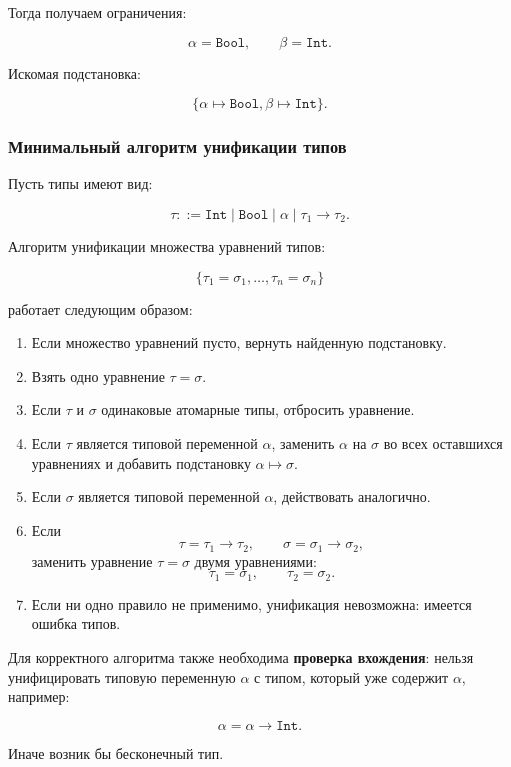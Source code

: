\documentclass[12pt,a4paper]{article}
\begin{document}
Тогда получаем ограничения:

\[
\alpha = \texttt{Bool},
\qquad
\beta = \texttt{Int}.
\]

Искомая подстановка:

\[
\{\alpha \mapsto \texttt{Bool}, \beta \mapsto \texttt{Int}\}.
\]

\subsubsection{Минимальный алгоритм унификации типов}

Пусть типы имеют вид:

\[
\tau ::= \texttt{Int}
\mid \texttt{Bool}
\mid \alpha
\mid \tau_1 \to \tau_2.
\]

Алгоритм унификации множества уравнений типов:

\[
\{\tau_1 = \sigma_1, \ldots, \tau_n = \sigma_n\}
\]

работает следующим образом:

\begin{enumerate}
    \item Если множество уравнений пусто, вернуть найденную подстановку.
    \item Взять одно уравнение \(\tau = \sigma\).
    \item Если \(\tau\) и \(\sigma\) одинаковые атомарные типы, отбросить уравнение.
    \item Если \(\tau\) является типовой переменной \(\alpha\), заменить \(\alpha\)
    на \(\sigma\) во всех оставшихся уравнениях и добавить подстановку
    \(\alpha \mapsto \sigma\).
    \item Если \(\sigma\) является типовой переменной \(\alpha\), действовать
    аналогично.
    \item Если
    \[
    \tau = \tau_1 \to \tau_2,
    \qquad
    \sigma = \sigma_1 \to \sigma_2,
    \]
    заменить уравнение \(\tau = \sigma\) двумя уравнениями:
    \[
    \tau_1 = \sigma_1,
    \qquad
    \tau_2 = \sigma_2.
    \]
    \item Если ни одно правило не применимо, унификация невозможна: имеется ошибка
    типов.
\end{enumerate}

Для корректного алгоритма также необходима \textbf{проверка вхождения}: нельзя
унифицировать типовую переменную \(\alpha\) с типом, который уже содержит \(\alpha\),
например:

\[
\alpha = \alpha \to \texttt{Int}.
\]

Иначе возник бы бесконечный тип.
\end{document}
